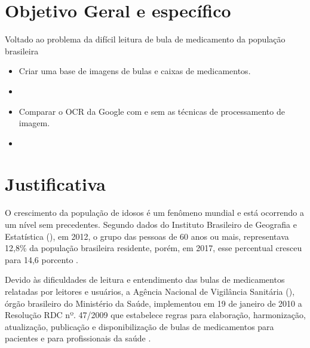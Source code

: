 \section{Objetivo Geral e específico}
Voltado ao problema da difícil leitura de bula  de medicamento da população brasileira %

\begin{itemize}
  \item Criar uma base de imagens de bulas e caixas de medicamentos.
    \item %
  \item Comparar o OCR da Google com e sem as técnicas de processamento de imagem.
  \item %
\end{itemize}



\section{Justificativa}
O crescimento da população de idosos é um fenômeno mundial e está ocorrendo a um nível sem precedentes. Segundo dados do Instituto Brasileiro de Geografia e Estatística (), em 2012, o grupo das pessoas de 60 anos ou mais, representava 12,8\% da população brasileira residente, porém, em 2017, esse percentual cresceu para 14,6 porcento \cite{jornaldocomercio1}.


Devido às dificuldades de leitura e entendimento das bulas de medicamentos relatadas por leitores e usuários, a Agência Nacional de Vigilância Sanitária (), órgão brasileiro do Ministério da Saúde, implementou em 19 de janeiro de 2010 a Resolução RDC nº. 47/2009 que estabelece regras para elaboração, harmonização, atualização, publicação e disponibilização de bulas de medicamentos para pacientes e para profissionais da saúde \cite{PORTALANVISA2019}.









